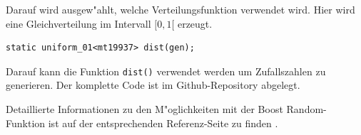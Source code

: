 \begin{refsection}
Darauf wird ausgew"ahlt, welche Verteilungsfunktion verwendet wird. Hier
wird eine Gleichverteilung im Intervall $[0,1[$ erzeugt.

\begin{lstlisting}[style=C]
static uniform_01<mt19937> dist(gen); 
\end{lstlisting}

Darauf kann die Funktion \texttt{dist()} verwendet werden um
Zufallszahlen zu generieren. Der komplette Code ist im Github-Repository
\cite{rng:githubRepo} abgelegt.

Detaillierte Informationen zu den M"oglichkeiten mit der Boost
Random-Funktion ist auf der entsprechenden Referenz-Seite zu finden
\cite{rng:boostRandom}.

\printbibliography[heading=subbibliography]
\end{refsection}
